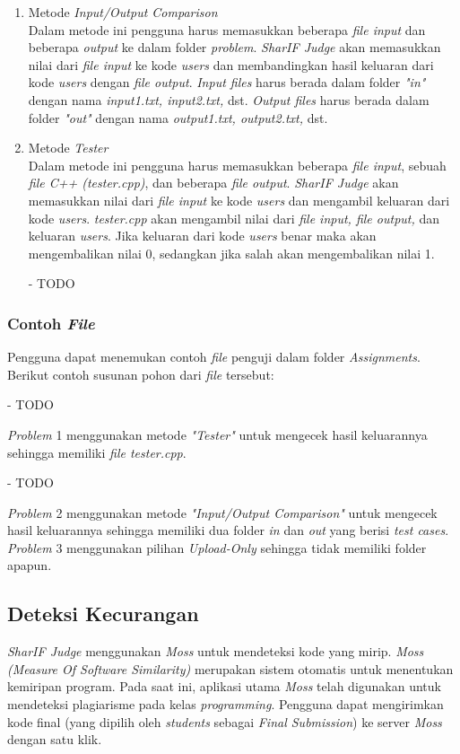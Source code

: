\begin{enumerate}
	\item Metode \textit{Input/Output Comparison} \\
	Dalam metode ini pengguna harus memasukkan beberapa \textit{file input} dan beberapa \textit{output} ke dalam folder \textit{problem}. \textit{SharIF Judge} akan memasukkan nilai dari \textit{file input} ke kode \textit{users} dan membandingkan hasil keluaran dari kode \textit{users} dengan \textit{file output}. \textit{Input files} harus berada dalam folder \textit{"in"} dengan nama \textit{input1.txt, input2.txt,} dst. \textit{Output files} harus berada dalam folder \textit{"out"} dengan nama \textit{output1.txt, output2.txt,} dst.
	
	\item Metode \textit{Tester} \\
	Dalam metode ini pengguna harus memasukkan beberapa \textit{file input}, sebuah \textit{file C++ (tester.cpp)}, dan beberapa \textit{file output}. \textit{SharIF Judge} akan memasukkan nilai dari \textit{file input} ke kode \textit{users} dan mengambil keluaran dari kode \textit{users}. \textit{tester.cpp} akan mengambil nilai dari \textit{file input, file output,} dan keluaran \textit{users}. Jika keluaran dari kode \textit{users} benar maka akan mengembalikan nilai 0, sedangkan jika salah akan mengembalikan nilai 1.
	
	- TODO
\end{enumerate}

\subsubsection{Contoh \textit{File}}
Pengguna dapat menemukan contoh \textit{file} penguji dalam folder \textit{Assignments}. Berikut contoh susunan pohon dari \textit{file} tersebut:

- TODO

\textit{Problem} 1 menggunakan metode \textit{"Tester"} untuk mengecek hasil keluarannya sehingga memiliki \textit{file tester.cpp}.

- TODO

\textit{Problem} 2 menggunakan metode \textit{"Input/Output Comparison"} untuk mengecek hasil keluarannya sehingga memiliki dua folder \textit{in} dan \textit{out} yang berisi \textit{test cases}. \textit{Problem} 3 menggunakan pilihan \textit{Upload-Only} sehingga tidak memiliki folder apapun.

\subsection{Deteksi Kecurangan}
\textit{SharIF Judge} menggunakan \textit{Moss} untuk mendeteksi kode yang mirip. \textit{Moss (Measure Of Software Similarity)} merupakan sistem otomatis untuk menentukan kemiripan program. Pada saat ini, aplikasi utama \textit{Moss} telah digunakan untuk mendeteksi plagiarisme pada kelas \textit{programming}. Pengguna dapat mengirimkan kode final (yang dipilih oleh \textit{students} sebagai \textit{Final Submission}) ke server \textit{Moss} dengan satu klik.

